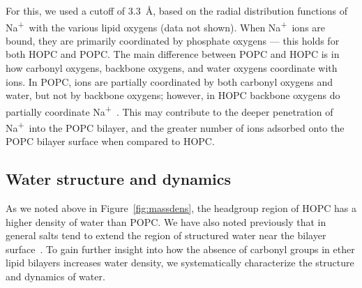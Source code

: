 \documentclass[12pt,openany,final]{book}
\newcommand{\na}{Na\textsuperscript{+}~}
\begin{document}
For this, we used a cutoff
of 3.3~\AA, based on the radial distribution functions of \na with the
various lipid oxygens (data not shown). When \na ions are bound, they are primarily coordinated by 
phosphate oxygens --- this holds for both HOPC and POPC. The main difference between POPC and HOPC is 
in how carbonyl oxygens, backbone oxygens, and water oxygens coordinate with ions. In POPC, ions are partially 
coordinated by both carbonyl oxygens and water, but not by backbone oxygens; however, in HOPC backbone oxygens do partially coordinate \na. 
This may contribute to the deeper penetration of \na into the POPC bilayer, and the greater number of ions adsorbed onto the POPC
bilayer surface when compared to HOPC.

\subsection{Water structure and dynamics}
\label{sec:waterstruc}
As we noted above in Figure~\ref{fig:massdens}, the headgroup region of HOPC has a higher density of water than 
POPC. We have also noted previously that in 
general salts tend to extend the region of structured water near the bilayer surface~\cite{kruczek:2017}. 
To gain further insight into how the absence of carbonyl groups in ether lipid bilayers increases water density, we systematically characterize the structure and dynamics of water.  
\end{document}
